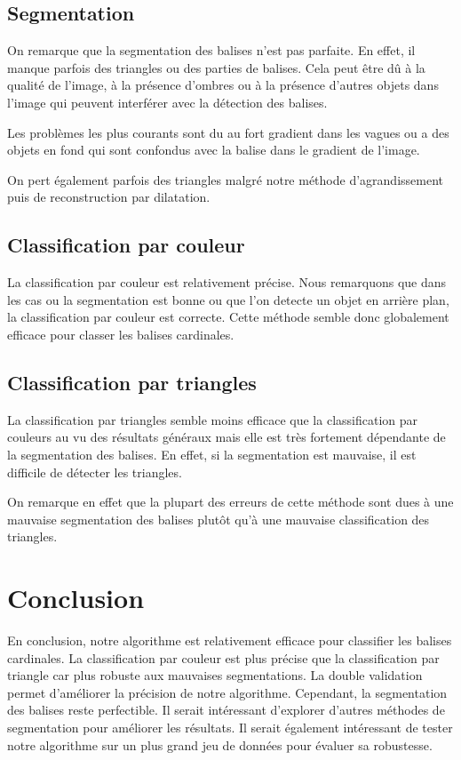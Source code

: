 \documentclass{article}
\begin{document}
\subsection{Segmentation}

On remarque que la segmentation des balises n'est pas parfaite. En effet, il
manque parfois des triangles ou des parties de balises. Cela peut être dû à la
qualité de l'image, à la présence d'ombres ou à la présence d'autres objets
dans l'image qui peuvent interférer avec la détection des balises.

Les problèmes les plus courants sont du au fort gradient dans les vagues ou a
des objets en fond qui sont confondus avec la balise dans le gradient de
l'image.

On pert également parfois des triangles malgré notre méthode d'agrandissement
puis de reconstruction par dilatation.

\subsection{Classification par couleur}

La classification par couleur est relativement précise. Nous remarquons que
dans les cas ou la segmentation est bonne ou que l'on detecte un objet en
arrière plan, la classification par couleur est correcte. Cette méthode semble
donc globalement efficace pour classer les balises cardinales.

\subsection{Classification par triangles}

La classification par triangles semble moins efficace que la classification par
couleurs au vu des résultats généraux mais elle est très fortement dépendante
de la segmentation des balises. En effet, si la segmentation est mauvaise, il
est difficile de détecter les triangles.

On remarque en effet que la plupart des erreurs de cette méthode sont dues à une
mauvaise segmentation des balises plutôt qu'à une mauvaise classification des
triangles.

\section{Conclusion}

En conclusion, notre algorithme est relativement efficace pour classifier les balises cardinales. La classification par couleur est plus précise que la classification par triangle car plus robuste aux mauvaises segmentations. La double validation permet d'améliorer la précision de notre algorithme. Cependant, la segmentation des balises reste perfectible. Il serait intéressant d'explorer d'autres méthodes de segmentation pour améliorer les résultats. Il serait également intéressant de tester notre algorithme sur un plus grand jeu de données pour évaluer sa robustesse.
\end{document}
